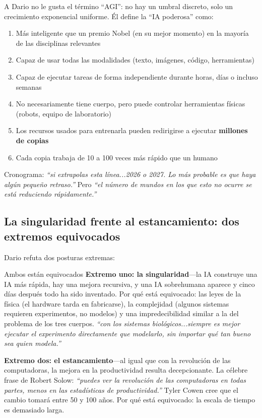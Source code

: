 \documentclass[a4paper]{article}
\begin{document}
A Dario no le gusta el término ``AGI'': no hay un umbral discreto, solo un crecimiento exponencial uniforme. Él define la ``IA poderosa'' como:

\begin{enumerate}
    \item Más inteligente que un premio Nobel (en su mejor momento) en la mayoría de las disciplinas relevantes
    \item Capaz de usar todas las modalidades (texto, imágenes, código, herramientas)
    \item Capaz de ejecutar tareas de forma independiente durante horas, días o incluso semanas
    \item No necesariamente tiene cuerpo, pero puede controlar herramientas físicas (robots, equipo de laboratorio)
    \item Los recursos usados para entrenarla pueden redirigirse a ejecutar \textbf{millones de copias}
    \item Cada copia trabaja de 10 a 100 veces más rápido que un humano
\end{enumerate}

Cronograma: \textit{``si extrapolas esta línea...2026 o 2027. Lo más probable es que haya algún pequeño retraso.''} Pero \textit{``el número de mundos en los que esto no ocurre se está reduciendo rápidamente.''}

\subsection{La singularidad frente al estancamiento: dos extremos equivocados}

Dario refuta dos posturas extremas:

\begin{warningbox}{Ambos están equivocados}
\textbf{Extremo uno: la singularidad}—la IA construye una IA más rápida, hay una mejora recursiva, y una IA sobrehumana aparece y cinco días después todo ha sido inventado. Por qué está equivocado: las leyes de la física (el hardware tarda en fabricarse), la complejidad (algunos sistemas requieren experimentos, no modelos) y una impredecibilidad similar a la del problema de los tres cuerpos. \textit{``con los sistemas biológicos...siempre es mejor ejecutar el experimento directamente que modelarlo, sin importar qué tan bueno sea quien modela.''}

\textbf{Extremo dos: el estancamiento}—al igual que con la revolución de las computadoras, la mejora en la productividad resulta decepcionante. La célebre frase de Robert Solow: \textit{``puedes ver la revolución de las computadoras en todas partes, menos en las estadísticas de productividad.''} Tyler Cowen cree que el cambio tomará entre 50 y 100 años. Por qué está equivocado: la escala de tiempo es demasiado larga.
\end{warningbox}
\end{document}
